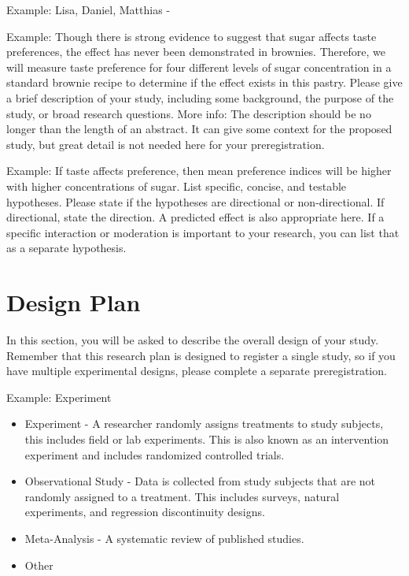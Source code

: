 \documentclass[highlight, explanations]{prereg}
\begin{document}
{Example: Lisa, Daniel, Matthias}
{-}

{Example: Though there is strong evidence to suggest that sugar affects taste preferences, the effect has never been demonstrated in brownies. Therefore, we will measure taste preference for four different levels of sugar concentration in a standard brownie recipe to determine if the effect exists in this pastry.}
{Please give a brief description of your study, including some background, the purpose of the study, or broad research questions. More info: The description should be no longer than the length of an abstract. It can give some context for the proposed study, but great detail is not needed here for your preregistration.}

{Example: If taste affects preference, then mean preference indices will be higher with higher concentrations of sugar. }
{List specific, concise, and testable hypotheses. Please state if the hypotheses are directional or non-directional. If directional, state the direction. A predicted effect is also appropriate here. If a specific interaction or moderation is important to your research, you can list that as a separate hypothesis. }


\section{Design Plan}
In this section, you will be asked to describe the overall design of your study. Remember that this research plan is designed to register a single study, so if you have multiple experimental designs, please complete a separate preregistration.

{Example: Experiment}
{\begin{itemize}
    \item Experiment - A researcher randomly assigns treatments to study subjects, this includes field or lab experiments. This is also known as an intervention experiment and includes randomized controlled trials.
    \item Observational Study - Data is collected from study subjects that are not randomly assigned to a treatment. This includes surveys, natural experiments, and regression discontinuity designs.
    \item Meta-Analysis - A systematic review of published studies.
    \item Other
\end{itemize}
}
\end{document}

